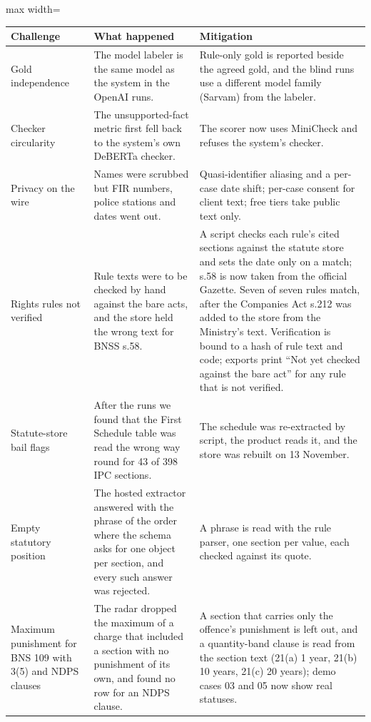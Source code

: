 \begin{table}[!t]
\centering\footnotesize
\begin{adjustbox}{max width=\textwidth}
\begin{tabular}{@{}p{4.6cm}p{5.4cm}p{5.2cm}@{}}
\toprule
Challenge & What happened & Mitigation \\
\midrule
Gold independence & The model labeler is the same model as the system in the OpenAI runs. & Rule-only gold is reported beside the agreed gold, and the blind runs use a different model family (Sarvam) from the labeler. \\
Checker circularity & The unsupported-fact metric first fell back to the system's own DeBERTa checker. & The scorer now uses MiniCheck and refuses the system's checker. \\
Privacy on the wire & Names were scrubbed but FIR numbers, police stations and dates went out. & Quasi-identifier aliasing and a per-case date shift; per-case consent for client text; free tiers take public text only. \\
Rights rules not verified & Rule texts were to be checked by hand against the bare acts, and the store held the wrong text for BNSS s.58. & A script checks each rule's cited sections against the statute store and sets the date only on a match; s.58 is now taken from the official Gazette. Seven of seven rules match, after the Companies Act s.212 was added to the store from the Ministry's text. Verification is bound to a hash of rule text and code; exports print ``Not yet checked against the bare act'' for any rule that is not verified. \\
Statute-store bail flags & After the runs we found that the First Schedule table was read the wrong way round for 43 of 398 IPC sections. & The schedule was re-extracted by script, the product reads it, and the store was rebuilt on 13 November. \\
Empty statutory position & The hosted extractor answered with the phrase of the order where the schema asks for one object per section, and every such answer was rejected. & A phrase is read with the rule parser, one section per value, each checked against its quote. \\
Maximum punishment for BNS 109 with 3(5) and NDPS clauses & The radar dropped the maximum of a charge that included a section with no punishment of its own, and found no row for an NDPS clause. & A section that carries only the offence's punishment is left out, and a quantity-band clause is read from the section text (21(a) 1 year, 21(b) 10 years, 21(c) 20 years); demo cases 03 and 05 now show real statuses. \\

\end{tabular}
\end{adjustbox}
\end{table}
